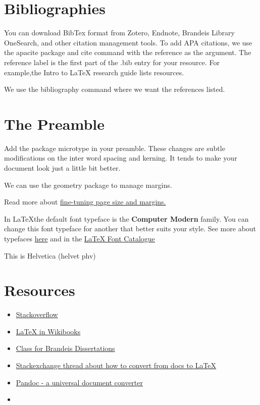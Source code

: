 \documentclass{article}
\begin{document}
\section{Bibliographies}
You can download BibTex format from Zotero, Endnote, Brandeis Library OneSearch, and other citation management tools.  To add APA citations, we use the apacite package and cite command with the reference as the argument.  The reference label is the first part of the .bib entry for your resource.  For example,the Intro to LaTeX research guide \cite{ClairePontbriand2019ItL} lists resources. 

We use the bibliography command where we want the references listed.  



\section{The Preamble}
Add the package microtype in your preamble. These changes are subtle modifications on the inter word spacing and kerning. It tends to make your document look just a little bit better. 

We can use the geometry package to manage margins.

Read more about \href{https://www.overleaf.com/learn/latex/Page_size_and_margins}{fine-tuning page size and margins.}

{\selectfont
In \LaTeX the default font typeface is the \textbf{Computer Modern} family. You can change this font typeface for another that better suits your style.
See more about typefaces \href{https://www.overleaf.com/learn/latex/Font_typefaces}{here} and in the \href{https://tug.org/FontCatalogue/}{LaTeX Font Catalogue}

This is Helvetica	(helvet	phv)
}

\section{Resources}
\begin{itemize}
    \item \href{https://stackoverflow.com/}{Stackoverflow}
    \item \href{https://en.wikibooks.org/wiki/LaTeX}{LaTeX in Wikibooks}
    \item \href{https://www.ctan.org/pkg/brandeis-dissertation?lang=en}{Class for Brandeis Dissertations}
    \item \href{https://tex.stackexchange.com/questions/183358/how-to-convert-a-google-docs-document-to-latex}{Stackexchange thread about how to convert from docs to \LaTeX}
    \item \href{https://pandoc.org/}{Pandoc - a universal document converter}
    \item \href{}{}
\end{itemize}


\end{document}
